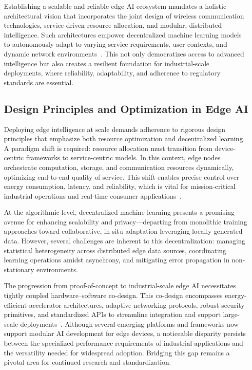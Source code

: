 \documentclass[sigconf]{acmart}
\begin{document}
Establishing a scalable and reliable edge AI ecosystem mandates a holistic architectural vision that incorporates the joint design of wireless communication technologies, service-driven resource allocation, and modular, distributed intelligence. Such architectures empower decentralized machine learning models to autonomously adapt to varying service requirements, user contexts, and dynamic network environments~\cite{ref49}. This not only democratizes access to advanced intelligence but also creates a resilient foundation for industrial-scale deployments, where reliability, adaptability, and adherence to regulatory standards are essential.

\subsection{Design Principles and Optimization in Edge AI}

Deploying edge intelligence at scale demands adherence to rigorous design principles that emphasize both resource optimization and decentralized learning. A paradigm shift is required: resource allocation must transition from device-centric frameworks to service-centric models. In this context, edge nodes orchestrate computation, storage, and communication resources dynamically, optimizing end-to-end quality of service. This shift enables precise control over energy consumption, latency, and reliability, which is vital for mission-critical industrial operations and real-time consumer applications~\cite{ref49}.

At the algorithmic level, decentralized machine learning presents a promising avenue for enhancing scalability and privacy—departing from monolithic training approaches toward collaborative, in situ adaptation leveraging locally generated data. However, several challenges are inherent to this decentralization: managing statistical heterogeneity across distributed edge data sources, coordinating learning operations amidst asynchrony, and mitigating error propagation in non-stationary environments.

The progression from proof-of-concept to industrial-scale edge AI necessitates tightly coupled hardware–software co-design. This co-design encompasses energy-efficient accelerator architectures, adaptive networking protocols, robust security primitives, and standardized APIs to streamline integration and support large-scale deployments~\cite{ref49}. Although several emerging platforms and frameworks now support modular AI development for edge devices, a noticeable disparity persists between the specialized performance requirements of industrial applications and the versatility needed for widespread adoption. Bridging this gap remains a pivotal area for continued research and standardization.
\end{document}
